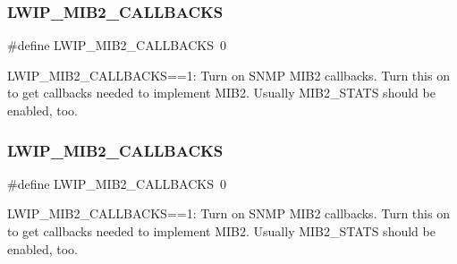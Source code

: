 \subsubsection{\texorpdfstring{L\+W\+I\+P\+\_\+\+M\+I\+B2\+\_\+\+C\+A\+L\+L\+B\+A\+C\+KS}{LWIP\_MIB2\_CALLBACKS}\hspace{0.1cm}{\footnotesize\ttfamily [1/2]}}
{\footnotesize\ttfamily \#define L\+W\+I\+P\+\_\+\+M\+I\+B2\+\_\+\+C\+A\+L\+L\+B\+A\+C\+KS~0}

L\+W\+I\+P\+\_\+\+M\+I\+B2\+\_\+\+C\+A\+L\+L\+B\+A\+C\+KS==1\+: Turn on S\+N\+MP M\+I\+B2 callbacks. Turn this on to get callbacks needed to implement M\+I\+B2. Usually M\+I\+B2\+\_\+\+S\+T\+A\+TS should be enabled, too. \mbox{\label{group__lwip__opts__mib2_gad84d6a781880cec19a1ef4b2339fea29}} 
\subsubsection{\texorpdfstring{L\+W\+I\+P\+\_\+\+M\+I\+B2\+\_\+\+C\+A\+L\+L\+B\+A\+C\+KS}{LWIP\_MIB2\_CALLBACKS}\hspace{0.1cm}{\footnotesize\ttfamily [2/2]}}
{\footnotesize\ttfamily \#define L\+W\+I\+P\+\_\+\+M\+I\+B2\+\_\+\+C\+A\+L\+L\+B\+A\+C\+KS~0}

L\+W\+I\+P\+\_\+\+M\+I\+B2\+\_\+\+C\+A\+L\+L\+B\+A\+C\+KS==1\+: Turn on S\+N\+MP M\+I\+B2 callbacks. Turn this on to get callbacks needed to implement M\+I\+B2. Usually M\+I\+B2\+\_\+\+S\+T\+A\+TS should be enabled, too. 